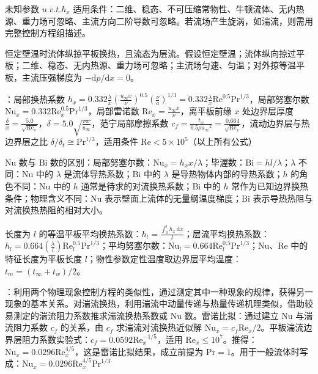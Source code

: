 未知参数 $u.v.t.h_x$ 适用条件：二维、稳态、不可压缩常物性、牛顿流体、无内热源、重力场可忽略、主流方向二阶导数可忽略。若流场产生旋涡，如湍流，则需用完整控制方程组描述。

\divider


恒定壁温时流体纵掠平板换热，且流态为层流。假设恒定壁温；流体纵向掠过平板；二维、稳态、无内热源、重力场可忽略；主流场匀速、匀温；对外掠等温平板，主流压强梯度为 $-\mathrm{d}p/\mathrm{d}x=0$。

：局部换热系数 $h_x=0.332\frac{\lambda}{x}\left(\frac{u_\infty x}{\nu}\right)^{0.5}\left(\frac{\nu}{a}\right)^{1/3}=0.332\frac{\lambda}{x}\mathrm{Re}^{0.5}\mathrm{Pr}^{1/3}$，局部努塞尔数 $\mathrm{Nu}_x=0.332\mathrm{Re}_x^{0.5}\mathrm{Pr}^{1/3}$，局部雷诺数 $\mathrm{Re}_x=\frac{u_\infty x}{\nu}$，离平板前缘 $x$ 处边界层厚度 $\frac{\delta}{x}=\frac{5.0}{\sqrt{\mathrm{Re}_x}}$，$\delta = 5.0\sqrt{\frac{\nu x}{u_\infty}}$，范宁局部摩擦系数 $c_f =\frac{t_w}{0.5\rho {u_\infty}^2}=\frac{0.664}{\sqrt{\mathrm{Re}_x}}$，流动边界层与热边界层之比 $\delta/\delta_t\cong \mathrm{Pr}^{1/3}$，适用条件 $\mathrm{Re}<5\times 10^5$（以上所有公式）

$\mathrm{Nu}$ 数与 $\mathrm{Bi}$ 数的区别：局部努塞尔数：$\mathrm{Nu}_x=h_xx/\lambda$；毕渥数：$\mathrm{Bi}=hl/\lambda$；$\lambda$ 不同：$\mathrm{Nu}$ 中的 $\lambda$ 是流体导热系数；$\mathrm{Bi}$ 中的 $\lambda$ 是导热物体内部的导热系数；$h$ 的角色不同：$\mathrm{Nu}$ 中的 $h$ 通常是待求的对流换热系数；$\mathrm{Bi}$ 中的 $h$ 常作为已知边界换热条件；物理含义不同：$\mathrm{Nu}$ 表示壁面上流体的无量纲温度梯度；$\mathrm{Bi}$ 表示导热热阻与对流换热热阻的相对大小。

长度为 $l$ 的等温平板平均换热系数：$h_l=\frac{\int_{0}^{l} h_x \, \mathrm{d}x}{l}$；层流平均换热系数：$h_l=0.664(\frac{\lambda}{l})\mathrm{Re}_l^{0.5}\mathrm{Pr}^{1/3}$；平均努塞尔数：$\mathrm{Nu}_l=0.664\mathrm{Re}_l^{0.5}\mathrm{Pr}^{1/3}$；$\mathrm{Nu}$、$\mathrm{Re}$ 中的特征长度为平板长度 $l$；物性参数定性温度取边界层平均温度：$t_m=(t_\infty+t_w)/2$。

：利用两个物理现象控制方程的类似性，通过测定其中一种现象的规律，获得另一现象的基本关系。对湍流换热，利用湍流中动量传递与热量传递机理类似，借助较易测定的湍流阻力系数推求湍流换热系数或 $\mathrm{Nu}$ 数。雷诺比拟：通过建立 $\mathrm{Nu}$ 与湍流阻力系数 $c_f$ 的关系，由 $c_f$ 求湍流对流换热近似解 $\mathrm{Nu}_x=c_f\mathrm{Re}_x/2$。平板湍流边界层阻力系数实验式：$c_f=0.0592\mathrm{Re}_x^{-1/5}$，适用 $\mathrm{Re}_x\le 10^7$。推得：$\mathrm{Nu}_x=0.0296\mathrm{Re}_x^{4/5}$，这是雷诺比拟结果，成立前提为 $\mathrm{Pr}=1$。用于一般流体时写成：$\mathrm{Nu}_x=0.0296\mathrm{Re}_x^{4/5}\mathrm{Pr}^{1/3}$

